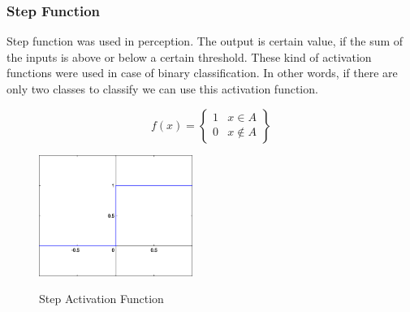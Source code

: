 \documentclass[12pt, a4paper]{report}
\begin{document}
\subsubsection{Step Function}\label{sec:step}
Step function was used in perception. The output is certain value, if the sum of the inputs is above or below a certain threshold. These kind of activation functions were used in case of binary classification. In other words, if there are only two classes to classify we can use this activation function.\\ \par
 \begin{equation}\label{eq:step}
f(x) = \begin{Bmatrix}
1 & x \in A \\ 
0 & x \notin A 
\end{Bmatrix}
\end{equation}

\begin{figure}[h]
\centering	
\includegraphics[width=5cm]{step.png}\\
\caption{Step Activation Function}
\label{fig:step}
\end{figure} 	
\end{document}
